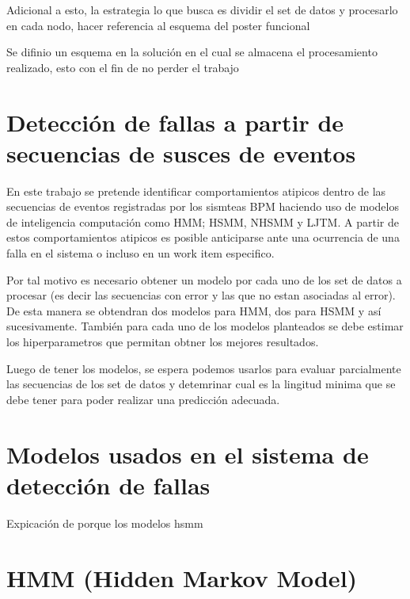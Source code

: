 Adicional a esto, la estrategia lo que busca es dividir el set de datos y procesarlo en cada nodo, hacer referencia al esquema del poster funcional


Se difinio un esquema en la solución en el cual se almacena el procesamiento realizado, esto con el fin de no perder el trabajo


\section{Detección de fallas a partir de secuencias de susces de eventos} %
\label{section2.4}

En este trabajo se pretende identificar comportamientos atipicos dentro de las secuencias de eventos registradas por los sismteas BPM haciendo uso de modelos de inteligencia computación como HMM; HSMM, NHSMM y LJTM. A partir de estos comportamientos atipicos es posible anticiparse ante una ocurrencia de una falla en el sistema o incluso en un work item especifico. 

Por tal motivo es necesario obtener un modelo por cada uno de los set de datos a procesar (es decir las secuencias con error y las que no estan asociadas al error). De esta manera se obtendran dos modelos para HMM, dos para HSMM y así sucesivamente. También para cada uno de los modelos planteados se debe estimar los hiperparametros que permitan obtner los mejores resultados. 


Luego de tener los modelos, se espera podemos usarlos para evaluar parcialmente las secuencias de los set de datos y detemrinar cual es la lingitud minima que se debe tener para poder realizar una predicción adecuada.




\section{Modelos usados en el sistema de detección de fallas} %
\label{section2.5}

Expicación de porque los modelos hsmm

\section*{HMM (Hidden Markov Model) }

